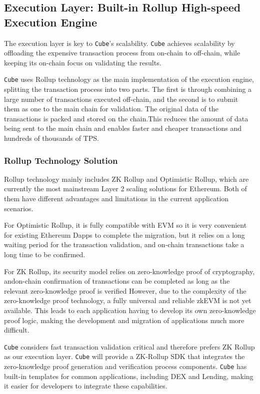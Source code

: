 \documentclass{iacrtrans}
\begin{document}
\subsection{Execution Layer: Built-in Rollup High-speed Execution Engine}
The execution layer is key to \texttt{Cube}'s scalability. \texttt{Cube} achieves scalability by offloading the expensive transaction process from on-chain to off-chain, while keeping its on-chain focus on validating the results. 

\texttt{Cube} uses Rollup technology as the main implementation of the execution engine, splitting the transaction process into two parts. The first is through combining a large number of transactions executed off-chain, and the second is to submit them as one to the main chain for validation. The original data of the transactions is packed and stored on the chain.This reduces the amount of data being sent to the main chain and enables faster and cheaper transactions and hundreds of thousands of TPS. 

\subsubsection{Rollup Technology Solution}
Rollup technology mainly includes ZK Rollup and Optimistic Rollup, which are currently the most mainstream Layer 2 scaling solutions for Ethereum. Both of them have different advantages and limitations in the current application scenarios. 

For Optimistic Rollup, it is fully compatible with EVM so it is very convenient for existing Ethereum Dapps to complete the migration, but it relies on a long waiting period for the transaction validation, and on-chain transactions take a long time to be confirmed.

For ZK Rollup, its security model relies on zero-knowledge proof of cryptography, andon-chain confirmation of transactions can be completed as long as the relevant zero-knowledge proof is verified However, due to the complexity of the zero-knowledge proof technology, a fully universal and reliable zkEVM is not yet available. This leads to each application having to develop its own zero-knowledge proof logic, making the development and migration of applications much more difficult.

\texttt{Cube} considers fast transaction validation critical and therefore prefers ZK Rollup as our execution layer. \texttt{Cube} will provide a ZK-Rollup SDK that integrates the zero-knowledge proof generation and verification process components. \texttt{Cube} has built-in templates for common applications, including DEX and Lending, making it easier for developers to integrate these capabilities.
\end{document}
